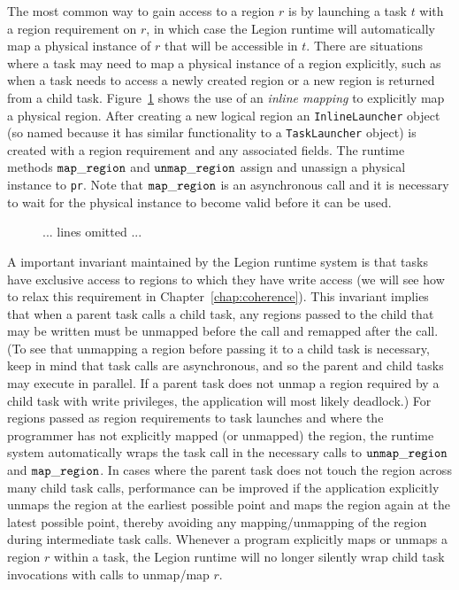 The most common way to gain access to a region $r$ is by launching a
task $t$ with a region requirement on $r$, in which case the Legion
runtime will automatically map a physical instance of $r$ that will be
accessible in $t$.  There are situations where a task may need to map
a physical instance of a region explicitly, such as when a task needs
to access a newly created region or a new region is returned from a
child task.  Figure~\ref{fig:inlinelaunch} shows the use of an {\em
  inline mapping} to explicitly map a physical region.  After creating
a new logical region an {\tt InlineLauncher} object (so named because
it has similar functionality to a {\tt TaskLauncher} object) is
created with a region requirement and any associated fields.  The
runtime methods $\tt map\_region$ and $\tt unmap\_region$ assign and
unassign a physical instance to {\tt pr}.  Note that $\tt map\_region$
is an asynchronous call and it is necessary to wait for the physical
instance to become valid before it can be used.

\begin{figure}
{\small
  
  ... lines omitted ...\\
  }
\caption{}
\label{fig:inlinelaunch}
\end{figure}

A important invariant maintained by the Legion runtime system is that
tasks have exclusive access to regions to which they have write access
(we will see how to relax this requirement in
Chapter~\ref{chap:coherence}).  This invariant implies that when a
parent task calls a child task, any regions passed to the child that
may be written must be unmapped before the call and remapped after the
call.  (To see that unmapping a region before passing it to a child
task is necessary, keep in mind that task calls are asynchronous, and
so the parent and child tasks may execute in parallel.  If a
parent task does not unmap a region required by a child task with
write privileges, the application will most likely deadlock.)  For
regions passed as region requirements to task launches and where the
programmer has not explicitly mapped (or unmapped) the region, the
runtime system automatically wraps the task call in the necessary
calls to $\tt unmap\_region$ and $\tt map\_region$.  In cases where
the parent task does not touch the region across many child task
calls, performance can be improved if the application explicitly
unmaps the region at the earliest possible point and maps the region
again at the latest possible point, thereby avoiding any
mapping/unmapping of the region during intermediate task calls.
Whenever a program explicitly maps or unmaps a region $r$ within a
task, the Legion runtime will no longer silently wrap child task
invocations with calls to unmap/map $r$.

